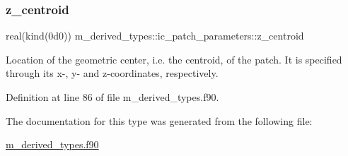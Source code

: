 \mbox{\label{structm__derived__types_1_1ic__patch__parameters_a950e604e891e3b9559dac102f2339977}} 
\subsubsection{\texorpdfstring{z\+\_\+centroid}{z\_centroid}}
{\footnotesize\ttfamily real(kind(0d0)) m\+\_\+derived\+\_\+types\+::ic\+\_\+patch\+\_\+parameters\+::z\+\_\+centroid}



Location of the geometric center, i.\+e. the centroid, of the patch. It is specified through its x-\/, y-\/ and z-\/coordinates, respectively. 



Definition at line 86 of file m\+\_\+derived\+\_\+types.\+f90.



The documentation for this type was generated from the following file\+:\begin{DoxyCompactItemize}
\item 
\hyperlink{m__derived__types_8f90}{m\+\_\+derived\+\_\+types.\+f90}\end{DoxyCompactItemize}
